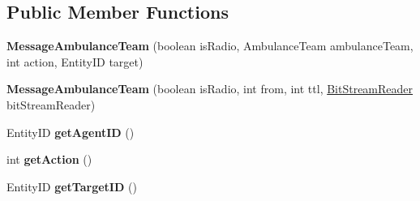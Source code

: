 \subsection*{Public Member Functions}
\begin{DoxyCompactItemize}
\item 
\hypertarget{classadf_1_1agent_1_1communication_1_1standard_1_1bundle_1_1information_1_1MessageAmbulanceTeam_a9825be764cf5caf0d91c4a3a9d4d36c7}{}\label{classadf_1_1agent_1_1communication_1_1standard_1_1bundle_1_1information_1_1MessageAmbulanceTeam_a9825be764cf5caf0d91c4a3a9d4d36c7} 
{\bfseries Message\+Ambulance\+Team} (boolean is\+Radio, Ambulance\+Team ambulance\+Team, int action, Entity\+ID target)
\item 
\hypertarget{classadf_1_1agent_1_1communication_1_1standard_1_1bundle_1_1information_1_1MessageAmbulanceTeam_aa0a2d6e659bf3942c90429f4a3537631}{}\label{classadf_1_1agent_1_1communication_1_1standard_1_1bundle_1_1information_1_1MessageAmbulanceTeam_aa0a2d6e659bf3942c90429f4a3537631} 
{\bfseries Message\+Ambulance\+Team} (boolean is\+Radio, int from, int ttl, \hyperlink{classadf_1_1component_1_1communication_1_1util_1_1BitStreamReader}{Bit\+Stream\+Reader} bit\+Stream\+Reader)
\item 
\hypertarget{classadf_1_1agent_1_1communication_1_1standard_1_1bundle_1_1information_1_1MessageAmbulanceTeam_ad264c0793cc9cfa2fa2a4f0d20dc63f3}{}\label{classadf_1_1agent_1_1communication_1_1standard_1_1bundle_1_1information_1_1MessageAmbulanceTeam_ad264c0793cc9cfa2fa2a4f0d20dc63f3} 
Entity\+ID {\bfseries get\+Agent\+ID} ()
\item 
\hypertarget{classadf_1_1agent_1_1communication_1_1standard_1_1bundle_1_1information_1_1MessageAmbulanceTeam_aeef32ab5437e6a90671f072abc5ecc54}{}\label{classadf_1_1agent_1_1communication_1_1standard_1_1bundle_1_1information_1_1MessageAmbulanceTeam_aeef32ab5437e6a90671f072abc5ecc54} 
int {\bfseries get\+Action} ()
\item 
\hypertarget{classadf_1_1agent_1_1communication_1_1standard_1_1bundle_1_1information_1_1MessageAmbulanceTeam_abf67f2c75d8a2ddf71f1984b40314918}{}\label{classadf_1_1agent_1_1communication_1_1standard_1_1bundle_1_1information_1_1MessageAmbulanceTeam_abf67f2c75d8a2ddf71f1984b40314918} 
Entity\+ID {\bfseries get\+Target\+ID} ()
\item 
\hypertarget{classadf_1_1agent_1_1communication_1_1standard_1_1bundle_1_1information_1_1MessageAmbulanceTeam_a95588d690a0871888568e5f01c9dea5d}{}\label{classadf_1_1agent_1_1communication_1_1standard_1_1bundle_1_1information_1_1MessageAmbulanceTeam_a95588d690a0871888568e5f01c9dea5d} 

\end{DoxyCompactItemize}
